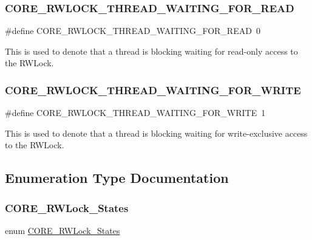 \subsubsection{\texorpdfstring{CORE\_RWLOCK\_THREAD\_WAITING\_FOR\_READ}{CORE\_RWLOCK\_THREAD\_WAITING\_FOR\_READ}}
{\footnotesize\ttfamily \#define C\+O\+R\+E\+\_\+\+R\+W\+L\+O\+C\+K\+\_\+\+T\+H\+R\+E\+A\+D\+\_\+\+W\+A\+I\+T\+I\+N\+G\+\_\+\+F\+O\+R\+\_\+\+R\+E\+AD~0}

This is used to denote that a thread is blocking waiting for read-\/only access to the R\+W\+Lock. \mbox{\label{group__RTEMSScoreRWLock_ga8612b7e5043e144b2479ec212ab9f820}} 
\subsubsection{\texorpdfstring{CORE\_RWLOCK\_THREAD\_WAITING\_FOR\_WRITE}{CORE\_RWLOCK\_THREAD\_WAITING\_FOR\_WRITE}}
{\footnotesize\ttfamily \#define C\+O\+R\+E\+\_\+\+R\+W\+L\+O\+C\+K\+\_\+\+T\+H\+R\+E\+A\+D\+\_\+\+W\+A\+I\+T\+I\+N\+G\+\_\+\+F\+O\+R\+\_\+\+W\+R\+I\+TE~1}

This is used to denote that a thread is blocking waiting for write-\/exclusive access to the R\+W\+Lock. 

\subsection{Enumeration Type Documentation}
\mbox{\label{group__RTEMSScoreRWLock_ga52fe4c69d9a2c96c1022416e951b90ec}} 
\subsubsection{\texorpdfstring{CORE\_RWLock\_States}{CORE\_RWLock\_States}}
{\footnotesize\ttfamily enum \mbox{\hyperlink{group__RTEMSScoreRWLock_ga52fe4c69d9a2c96c1022416e951b90ec}{C\+O\+R\+E\+\_\+\+R\+W\+Lock\+\_\+\+States}}}

